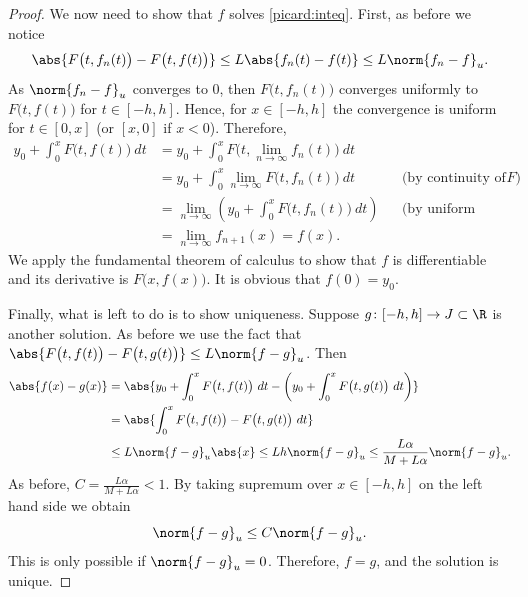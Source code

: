 \documentclass[12pt]{book}
\begin{document}
\begin{proof}
We now need to show that $f$ solves \eqref{picard:inteq}.
First, as before we notice
\begin{equation*}
\abs{F\bigl(t,f_{n}(t)\bigr) - 
F\bigl(t,f(t)\bigr)}
\leq
L \abs{f_n(t)-f(t)}
\leq
L \norm{f_n-f}_u .
\end{equation*}
As $\norm{f_n-f}_u$ converges to 0, then
$F\bigl(t,f_n(t)\bigr)$ converges uniformly to $F\bigl(t,f(t)\bigr)$
for $t \in [-h,h]$.
Hence, for $x \in [-h,h]$
the convergence is uniform %
for $t \in [0,x]$ (or $[x,0]$ if $x < 0$).
Therefore,
\begin{align*}
y_0
+
\int_0^{x}
F(t,f(t)\bigr)~dt
& =
y_0
+
\int_0^{x}
F\bigl(t,\lim_{n\to\infty} f_n(t)\bigr)~dt
& &
\\
& =
y_0
+
\int_0^{x}
\lim_{n\to\infty} F\bigl(t,f_n(t)\bigr)~dt
& & \text{(by continuity of $F$)}
\\
& =
\lim_{n\to\infty} 
\left(
y_0
+
\int_0^{x}
F\bigl(t,f_n(t)\bigr)~dt
\right)
& & \text{(by uniform convergence)}
\\
& =
\lim_{n\to\infty} 
f_{n+1}(x)
=
f(x) .
& &
\end{align*}
We apply the fundamental theorem of calculus to show that
$f$ is differentiable and its derivative is $F\bigl(x,f(x)\bigr)$.
It is obvious
that $f(0) = y_0$.

Finally, what is left to do is to show uniqueness.
Suppose $g \colon [-h,h]
\to J \subset \R$ is another solution.
As before we use the fact that
$\abs{F\bigl(t,f(t)\bigr) - F\bigl(t,g(t)\bigr)} \leq L \norm{f-g}_u$.
Then
\begin{equation*}
\begin{split}
\abs{f(x)-g(x)}
& =
\abs{
y_0
+
\int_0^{x}
F\bigl(t,f(t)\bigr)~dt
-
\left(
y_0
+
\int_0^{x}
F\bigl(t,g(t)\bigr)~dt
\right)
}
\\
& =
\abs{
\int_0^{x}
F\bigl(t,f(t)\bigr)
-
F\bigl(t,g(t)\bigr)~dt
}
\\
& \leq
L\norm{f-g}_u\abs{x}
\leq
Lh\norm{f-g}_u
\leq
\frac{L\alpha}{M+L\alpha}\norm{f-g}_u .
\end{split}
\end{equation*}
As 
before, $C = \frac{L\alpha}{M+L\alpha} < 1$.
By taking supremum over $x \in
[-h,h]$ on the left
hand side we obtain
\begin{equation*}
\norm{f-g}_u \leq C \norm{f-g}_u .
\end{equation*}
This is only possible if $\norm{f-g}_u = 0$.
Therefore, $f=g$, and the
solution is unique.
\end{proof}
\end{document}

